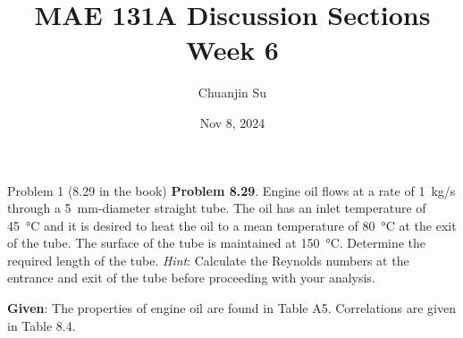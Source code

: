 \documentclass[9pt, aspectratio=169, handout]{beamer}
\title{MAE 131A Discussion Sections\\ Week 6}
\author{Chuanjin Su}
\institute[UCLA MAE]{Mechanical and Aerospace Engineering Department\\
    University of California, Los Angeles}
\date{Nov 8, 2024}
\begin{document}
\begin{frame}
    \titlepage
\end{frame}

\begin{frame}{Problem 1 (8.29 in the book)}
    \textbf{Problem 8.29}. Engine oil flows at a rate of \SI{1}{kg/s} through a \SI{5}{mm}-diameter straight tube. The oil has an inlet temperature of \SI{45}{\celsius} and it is desired to heat the oil to a mean temperature of \SI{80}{\celsius} at the exit of the tube. The surface of the tube is maintained at \SI{150}{\celsius}. Determine the required length of the tube. \textit{Hint}: Calculate the Reynolds numbers at the entrance and exit of the tube before proceeding with your analysis.

    \vspace{1ex}
    \textbf{Given}: The properties of engine oil are found in Table A5. Correlations are given in Table 8.4.
\end{frame}
\end{document}
